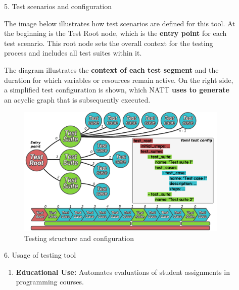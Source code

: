\documentclass[final]{beamer}
\newlength{\sepwidth}
\newlength{\colwidth}
\newcommand{\separatorcolumn}{\begin{column}{\sepwidth}\end{column}}
\begin{document}
\begin{frame}[t]
\begin{columns}[t]
\begin{column}{\colwidth}
\end{column}

\separatorcolumn

\begin{column}{\colwidth}

  \begin{block}{5. Test scenarios and configuration}

    The image below illustrates how test scenarios are defined for this tool. At the 
    beginning is the Test Root node, which is the \textbf{entry point} for each test 
    scenario. This root node sets the overall context for the testing 
    process and includes all test suites within it. 

    \hspace{2em} The diagram illustrates the \textbf{context of each test segment} and the 
    duration for which variables or resources remain active. On the right side, a simplified
    test configuration is shown, which NATT \textbf{uses to generate} an acyclic graph that 
    is subsequently executed.

    \begin{figure}
      \centering
        \includegraphics[width=1.0\textwidth]{./imgs/test-scruct-and-config.png}
      \caption{Testing structure and configuration}
    \end{figure}

  \end{block}

  \begin{exampleblock}{6. Usage of testing tool}

    \begin{enumerate}
      \item \textbf{Educational Use:} Automates evaluations of student assignments in programming courses.
      

\end{enumerate}
\end{exampleblock}
\end{column}
\end{columns}
\end{frame}
\end{document}

